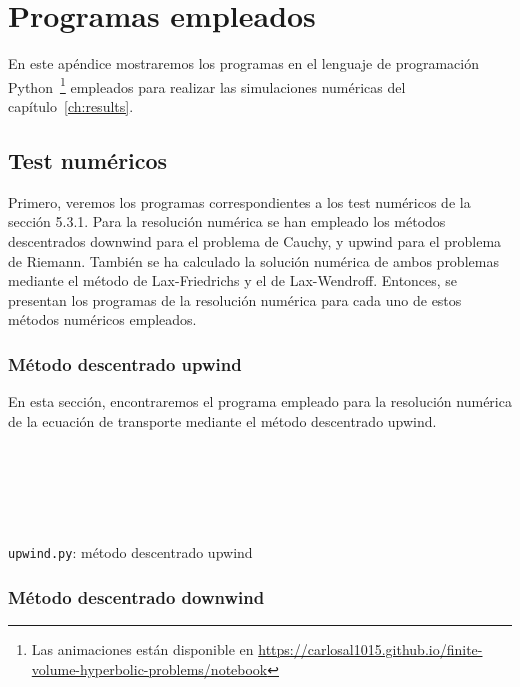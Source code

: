 \chapter{Programas empleados}

En este apéndice mostraremos los programas en el lenguaje de
programación
Python~\footnote{Las animaciones están disponible en \url{https://carlosal1015.github.io/finite-volume-hyperbolic-problems/notebook}}
empleados para realizar las simulaciones
numéricas del capítulo~\ref{ch:results}.

\section{Test numéricos}

Primero, veremos los programas correspondientes a los test numéricos
de la sección 5.3.1.
Para la resolución numérica se han empleado los métodos descentrados
downwind para el problema de Cauchy, y upwind para el problema de
Riemann.
También se ha calculado la solución numérica de ambos problemas
mediante el método de Lax-Friedrichs y el de Lax-Wendroff.
Entonces, se presentan los programas de la resolución numérica
para cada uno de estos métodos numéricos empleados.

\clearpage
\subsection{Método descentrado upwind}

En esta sección, encontraremos el programa empleado para la
resolución numérica de la ecuación de transporte mediante el método
descentrado upwind.

\begin{listing}[ht!]
    \tiny
    \centering
    \inputminted[firstline=1,lastline=2]{python}{upwind.py}
    \inputminted[firstline=4,lastline=7]{python}{upwind.py}
    \inputminted[firstline=10,lastline=11]{python}{upwind.py}
    \inputminted[firstline=14,lastline=33]{python}{upwind.py}
    \inputminted[firstline=35,lastline=35]{python}{upwind.py}
    \inputminted[firstline=38,lastline=42]{python}{upwind.py}
    \inputminted[firstline=45,lastline=53]{python}{upwind.py}
    \caption{\texttt{upwind.py}: método descentrado upwind}
\end{listing}

\clearpage
\subsection{Método descentrado downwind}

